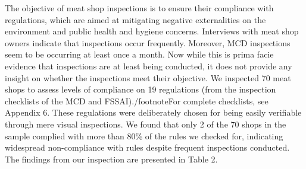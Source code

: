 \documentclass[a4paper, 12pt]{article}
\begin{document}
The objective of meat shop inspections is to ensure their compliance with regulations, which are aimed at mitigating negative externalities on the environment and public health and hygiene concerns. Interviews with meat shop owners indicate that inspections occur frequently. Moreover, MCD inspections seem to be occurring at least once a month. Now while this is prima facie evidence that inspections are at least being conducted, it does not provide any insight on whether the inspections meet their objective. We inspected 70 meat shops to assess levels of compliance on 19 regulations (from the inspection checklists of the MCD and FSSAI)./footnote{For complete checklists, see Appendix 6.} These regulations were deliberately chosen for being easily verifiable through mere visual inspections. We found that only 2 of the 70 shops in the sample complied with more than 80\% of the rules we checked for, indicating widespread non-compliance with rules despite frequent inspections conducted. \\

The findings from our inspection are presented in Table 2. \\
\end{document}
